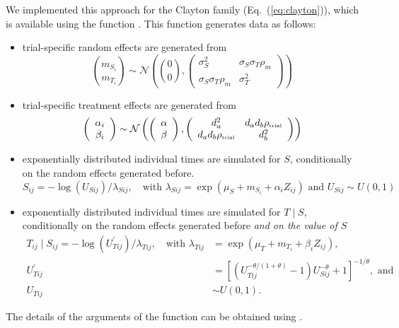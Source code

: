 \documentclass[]{scrartcl}\usepackage[]{graphicx}\usepackage[]{color}
\begin{document}
{{We implemented this approach for the Clayton family (Eq.~(\ref{eq:clayton})),
  which is available using the function .
This function generates data as follows:
  \begin{itemize}
    \item trial-specific random effects are generated from
      $$
      \binom{m_{S_i}}{m_{T_i}} \sim \mathcal N \left(
      \binom00, \left(\begin{array}{cc}
      \sigma^2_S & \sigma_S\sigma_T\rho_m \\
      \sigma_S\sigma_T\rho_m &  \sigma^2_T
      \end{array}\right)
      \right)
      $$
    \item trial-specific treatment effects are generated from
      $$
      \left(\begin{array}{c} 
      {\alpha_i}\\ {\beta_i}\end{array}\right)
      \sim \mathcal N
      \left(
      \left(\begin{array}{c}
      \alpha\\ \beta\end{array}\right), 
      \left(\begin{array}{cc} 
      d_a^2 &
      d_a d_b{\rho_\text{\tiny trial}} \\
      d_a d_b{\rho_\text{\tiny trial}} &
      d_b^2 \\
      \end{array}\right)
      \right)
      $$
    \item exponentially distributed individual times are simulated
      for $S$, conditionally on the random effects generated before.
      $$
      S_{ij} = -\log(U_{Sij}) / \lambda_{Sij},
      \quad \text{with } 
      \lambda_{Sij} = \exp(\mu_S + m_{S_i} + \alpha_i Z_{ij})
      \text{ and } U_{Sij} \sim U(0,1)
      $$
    \item exponentially distributed individual times are simulated
      for $T\mid S$, conditionally on the random effects generated before
      \textit{and on the value of $S$}
      \begin{align*}
      T_{ij} \mid S_{ij} = -\log(U^\prime_{Tij}) / \lambda_{Tij},
      \quad \text{with }
      \lambda_{Tij} &= \exp(\mu_T + m_{T_i} + \beta_i  Z_{ij}), \\
      U_{Tij}^\prime &= \left[\left(U_{Tij}^{-\theta/(1+\theta)} - 1
      \right) U_{Sij}^{-\theta} + 1 \right]^{-1/\theta}, \text{ and}\\
      U_{Tij} &\sim U(0,1).
    \end{align*}
  \end{itemize}
The details of the arguments of the  function can be 
  obtained using .

}}
\end{document}
